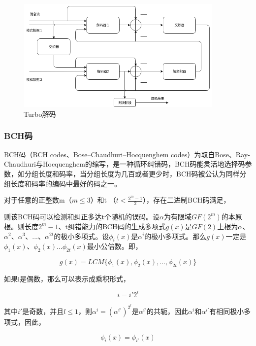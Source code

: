 \begin{figure}[htbp!]
    \centering \includegraphics[width=0.9\textwidth]{images/turbo_decode} 
    \caption{Turbo解码}
    \label{turbo_decode}
\end{figure}


\subsubsection{BCH码}

BCH码（BCH codes、Bose–Chaudhuri–Hocquenghem codes）为取自Bose、Ray-Chaudhuri与Hocquenghem的缩写，是一种循环纠错码，BCH码能灵活地选择码参数，如分组长度和码率，当分组长度为几百或者更少时，BCH码被公认为同样分组长度和码率的编码中最好的码之一。

对于任意的正整数m（$m \leq 3 $）和t （$ t < \frac{2^m - 1}{2} $），存在二进制BCH码满足，

则该BCH码可以检测和纠正多达t个随机的误码。设$\alpha$为有限域$GF(2^m)$的本原根。则长度$2^m - 1$、t纠错能力的BCH码的生成多项式$g(x)$是$GF(2)$上根为$\alpha$、${\alpha}^2$、${\alpha}^3$、...、${\alpha}^{2t}$的极小多项式。设$\phi_i(x)$是$\alpha^i$的极小多项式。那么$g(x)$一定是$\phi_1(x)$、$\phi_2(x)$...$\phi_{2t}(x)$最小公倍数。即，

\begin{equation}
    g(x) = LCM\{\phi_1(x), \phi_2(x), ... , \phi_{2t}(x)\}
\end{equation}

如果i是偶数，那么可以表示成乘积形式，

\begin{equation}
    i = i'2^l
\end{equation}

其中$i'$是奇数，并且$l \leq 1$，则$\alpha^i = (\alpha^{i'})^{2^l}$是$\alpha^{i'}$的共轭，因此$\alpha^i$和$\alpha^{i'}$有相同极小多项式，因此，

\begin{equation}
    \phi_i(x) = \phi_{i'}(x)
\end{equation}


